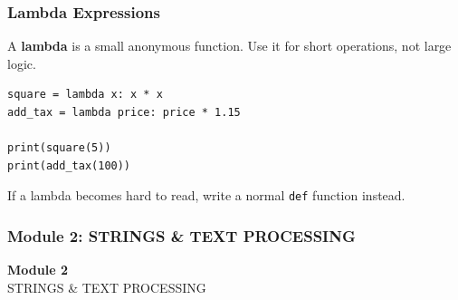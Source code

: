 \documentclass[aspectratio=169,10pt]{beamer}
\newcommand{\keyword}[1]{\textcolor{PrimaryBlue}{\textbf{#1}}}
\begin{document}
\begin{frame}[fragile]
\frametitle{Lambda Expressions}
\small
A \keyword{lambda} is a small anonymous function. Use it for short operations, not large logic.

\vspace{0.1cm}
\begin{lstlisting}[style=pycode]
square = lambda x: x * x
add_tax = lambda price: price * 1.15

print(square(5))
print(add_tax(100))
\end{lstlisting}

\begin{tcolorbox}[lecturebox,title=Rule of thumb]
If a lambda becomes hard to read, write a normal \texttt{def} function instead.
\end{tcolorbox}
\end{frame}

\begin{noheadline}
\begin{frame}
\frametitle{Module 2: STRINGS \& TEXT PROCESSING}
\vspace{1.2cm}
\begin{center}
  {\fontsize{30}{36}\selectfont\textbf{Module 2}}\\[0.35cm]
  {\fontsize{25}{30}\selectfont STRINGS \& TEXT PROCESSING}\\[0.7cm]
\end{center}
\end{frame}
\end{noheadline}
\end{document}
